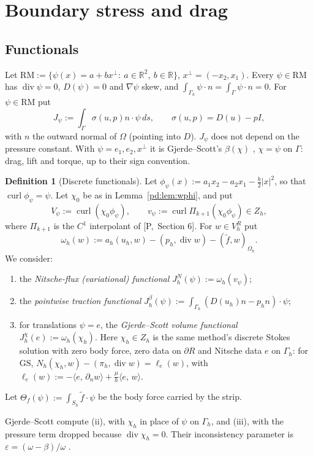 \documentclass[11pt,reqno]{amsart}
\theoremstyle{plain}
\theoremstyle{definition}
\newtheorem{definition}[theorem]{Definition}
\newcommand{\R}{\mathbb R}
\newcommand{\Gh}{\Gamma_h}
\newcommand{\Oh}{\Omega_h}
\newcommand{\VR}{V_h^R}
\newcommand{\Zh}{Z_h}
\newcommand{\dn}{\partial_n}
\newcommand{\ft}{\tilde f}
\newcommand{\ip}[2]{\langle #1,\, #2\rangle}
\newcommand{\GS}{\mathrm{GS}}
\newcommand{\curl}{\operatorname{curl}}
\renewcommand{\div}{\operatorname{div}}
\newcommand{\Pref}[1]{\textup{[P,~#1]}}
\newcommand{\RM}{\mathrm{RM}}
\begin{document}
\section{Boundary stress and drag}\label{pd:sec:drag}

\subsection{Functionals}
Let $\RM:=\{\psi(x)=a+bx^\perp:\ a\in\R^2,\ b\in\R\}$, $x^\perp=(-x_2,x_1)$. Every $\psi\in\RM$ has $\div\psi=0$, $D(\psi)=0$ and $\nabla\psi$ skew, and $\int_{\Gh}\psi\cdot n=\int_\Gamma\psi\cdot n=0$. For $\psi\in\RM$ put
\[
J_\psi:=\int_\Gamma\sigma(u,p)n\cdot\psi\,ds,\qquad\sigma(u,p)=D(u)-pI,
\]
with $n$ the outward normal of $\Omega$ (pointing into $D$). $J_\psi$ does not depend on the pressure constant. With $\psi=e_1,e_2,x^\perp$ it is Gjerde--Scott's $\beta(\chi)$ \cite[(3)]{GS}, $\chi=\psi$ on $\Gamma$: drag, lift and torque, up to their sign convention.

\begin{definition}[Discrete functionals]\label{pd:def:funct}
Let $\phi_\psi(x):=a_1x_2-a_2x_1-\frac b2|x|^2$, so that $\curl\phi_\psi=\psi$. Let $\chi_0$ be as in Lemma~\ref{pd:lem:wphi}, and put
\[
V_\psi:=\curl(\chi_0\phi_\psi),\qquad v_\psi:=\curl\Pi_{k+1}(\chi_0\phi_\psi)\in\Zh,
\]
where $\Pi_{k+1}$ is the $C^1$ interpolant of \Pref{Section 6}. For $w\in\VR$ put
\[
\omega_h(w):=a_h(u_h,w)-(p_h,\div w)-(\ft,w)_{\Oh}.
\]
We consider:
\begin{enumerate}[label=(\roman*)]
\item the \emph{Nitsche-flux (variational) functional} $J^N_h(\psi):=\omega_h(v_\psi)$;
\item the \emph{pointwise traction functional} $J^\beta_h(\psi):=\int_{\Gh}(D(u_h)n-p_hn)\cdot\psi$;
\item for translations $\psi=e$, the \emph{Gjerde--Scott volume functional} $J^\chi_h(e):=\omega_h(\chi_h)$. Here $\chi_h\in\Zh$ is the same method's discrete Stokes solution with zero body force, zero data on $\partial R$ and Nitsche data $e$ on $\Gh$: for $\GS$, $N_h(\chi_h,w)-(\pi_h,\div w)=\ell_e(w)$, with $\ell_e(w):=-\ip e{\dn w}+\frac\mu h\ip ew$.
\end{enumerate}
Let $\Theta_f(\psi):=\int_{S_h}\ft\cdot\psi$ be the body force carried by the strip.
\end{definition}

Gjerde--Scott compute (ii), with $\chi_h$ in place of $\psi$ on $\Gh$, and (iii), with the pressure term dropped because $\div\chi_h=0$. Their inconsistency parameter is $\varepsilon=(\omega-\beta)/\omega$ \cite[(10)]{GS}.
\end{document}
